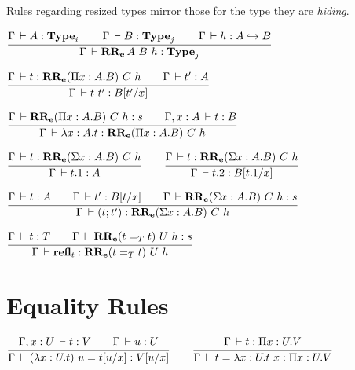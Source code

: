 \documentclass[a4paper,english]{lipics-utf8x}
\begin{document}
  \noindent %
  Rules regarding resized types mirror those for the type they are
  \emph{hiding}.

  \begin{center}
  \(
    \ru{\Gamma \der A : \Type_i \qquad
        \Gamma \der B : \Type_j \qquad
        \Gamma \der h : \emb{A}{B}
      }{\Gamma \der \RRe{A}{B}{h} : \Type_j}
  \)
  \end{center}

  \begin{center}
  \(
    \ru{\Gamma \der t : \RRe{(\Pi x:A.B)}{C}{h} \qquad
        \Gamma \der t' : A
      }{\Gamma \der t\ t' : B[t'/x]}
  \)
  \end{center}

  \begin{center}
  \(
    \ru{\Gamma \der \RRe{(\Pi x:A.B)}{C}{h} : s \qquad
        \Gamma, x:A \der t : B
      }{\Gamma \der \lambda x:A.t : \RRe{(\Pi x:A.B)}{C}{h}}
  \)
  \end{center}

  \begin{center}
  \(
    \ru{\Gamma \der t : \RRe{(\Sigma x:A.B)}{C}{h}
      }{\Gamma \der t.1 : A}
    \qquad
    \ru{\Gamma \der t : \RRe{(\Sigma x:A.B)}{C}{h}
      }{\Gamma \der t.2 : B[t.1/x]}
  \)
  \end{center}

  \begin{center}
  \(
    \ru{\Gamma \der t : A \qquad
        \Gamma \der t' : B[t/x] \qquad
        \Gamma \der \RRe{(\Sigma x:A.B)}{C}{h} : s
      }{\Gamma \der (t;t') : \RRe{(\Sigma x:A.B)}{C}{h}}
  \)
  \end{center}

  \begin{center}
  \(
    \ru{\Gamma \der t : T \qquad
        \Gamma \der \RRe{(t =_T t)}{U}{h} : s
      }{\Gamma \der \refl_t : \RRe{(t =_T t)}{U}{h}}
  \)
  \end{center}

\section{Equality Rules}


\begin{center}
\(
  \ru{\Gamma, x:U \der t:V \qquad
      \Gamma \der u : U
    }{\Gamma \der (\lambda x:U.t)~u = t[u/x] : V[u/x]}
  \qquad
  \ru{\Gamma \der t : \Pi x:U.V
    }{\Gamma \der t = \lambda x:U.t~x : \Pi x:U.V}
\)
\end{center}
\end{document}
